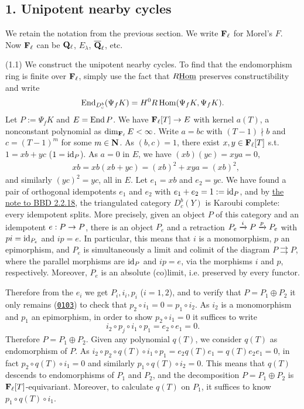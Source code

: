 \documentclass[deligne.tex]{subfiles}
\begin{document}
\subsection*{1. Unipotent nearby cycles}
We retain the notation from the previous section.
We write $\mathbf{F}_\ell$ for Morel's $F$. Now $\mathbf{F}_\ell$ can be
$\mathbf{Q}_\ell$, $E_\lambda$, $\overline{\mathbf{Q}}_\ell$, etc.

(1.1) We construct the unipotent nearby cycles.
To find that the endomorphism ring is finite over $\mathbf{F}_\ell$, simply
use the fact that $R\underline{\operatorname{Hom}}$ preserves constructibility and write
\begin{equation*}
	\operatorname{End}_{D_c^b}(\Psi_f K)=H^0R\operatorname{Hom}(\Psi_f K,\Psi_f K).
\end{equation*}
Let $P:=\Psi_fK$ and $E=\operatorname{End} P$. We have $\mathbf{F}_\ell[T]\rightarrow E$ with kernel
$a(T)$, a nonconstant polynomial as $\dim_{\mathbf{F}_\ell}E<\infty$.
Write $a=bc$ with $(T-1)\nmid b$ and $c=(T-1)^m$ for some $m\in\mathbf{N}$.
As $(b,c)=1$, there exist $x,y\in\mathbf{F}_\ell[T]$ s.t. $1=xb+yc$ ($1=\operatorname{id}_P$).
As $a=0$ in $E$, we have $(xb)(yc)=xya=0$,
\begin{align*}
	&xb=xb(xb+yc)=(xb)^2+xya=(xb)^2,
\end{align*}
and similarly $(yc)^2=yc$, all in $E$. Let $e_1=xb$ and $e_2=yc$.
We have found a pair of orthogonal idempotents $e_1$ and $e_2$ with
$e_1+e_2=1:=\operatorname{id}_P$, and by
\hyperref[BBD:2.2.18]{the note to BBD 2.2.18}, the triangulated category
$D_c^b(Y)$ is Karoubi complete: every idempotent splits. More precisely,
given an object $P$ of this category and an idempotent $e:P\rightarrow P$, there is
an object $P_e$ and a retraction $P_e\xrightarrow i P\xrightarrow p P_e$ with $pi=\operatorname{id}_{P_e}$
and $ip=e$. In particular, this means that $i$ is a monomorphism, $p$ an
epimorphism, and $P_e$ is simultaneously a limit and colimit of the diagram
$P\rightrightarrows P$, where the parallel morphisms are $\operatorname{id}_P$ and $ip=e$,
via the morphisms $i$ and $p$, respectively. Moreover, $P_e$ is an absolute
(co)limit, i.e. preserved by every functor. 

Therefore from the $e_i$ we get $P_i,i_i,p_i$ ($i=1,2$), and to verify that
$P=P_1\oplus P_2$ it only remains
(\hyperref[https://stacks.math.columbia.edu/tag/0103]{\texttt{0103}})
to check that $p_2\circ i_1=0=p_1\circ i_2$. As $i_2$ is a monomorphism and
$p_1$ an epimorphism, in order to show $p_2\circ i_1=0$ it suffices to write
\begin{equation*}
	i_2\circ p_j\circ i_1\circ p_1=e_2\circ e_1=0.
\end{equation*}
Therefore $P=P_1\oplus P_2$.
Given any polynomial $q(T)$, we consider $q(T)$ as endomorphism of $P$.
As $i_2\circ p_2\circ q(T)\circ i_1 \circ p_1=e_2 q(T) e_1=q(T)e_2e_1=0$,
in fact $p_2\circ q(T)\circ i_1=0$ and similarly $p_1\circ q(T)\circ i_2=0$.
This means that $q(T)$ descends to endomorphisms of $P_1$ and $P_2$, and
the decomposition $P=P_1\oplus P_2$ is $\mathbf{F}_\ell[T]$-equivariant.
Moreover, to calculate $q(T)$ on $P_1$, it suffices to know
$p_1\circ q(T)\circ i_1$.
\end{document}
